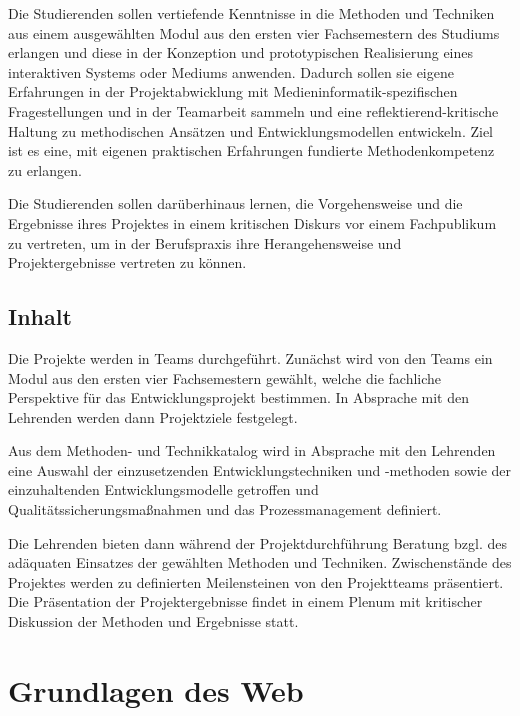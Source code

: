 Die Studierenden sollen vertiefende Kenntnisse in die Methoden und
Techniken aus einem ausgewählten Modul aus den ersten vier Fachsemestern
des Studiums erlangen und diese in der Konzeption und prototypischen
Realisierung eines interaktiven Systems oder Mediums anwenden. Dadurch
sollen sie eigene Erfahrungen in der Projektabwicklung mit
Medieninformatik-spezifischen Fragestellungen und in der Teamarbeit
sammeln und eine reflektierend-kritische Haltung zu methodischen
Ansätzen und Entwicklungsmodellen entwickeln. Ziel ist es eine, mit
eigenen praktischen Erfahrungen fundierte Methodenkompetenz zu erlangen.

Die Studierenden sollen darüberhinaus lernen, die Vorgehensweise und die
Ergebnisse ihres Projektes in einem kritischen Diskurs vor einem
Fachpublikum zu vertreten, um in der Berufspraxis ihre Herangehensweise
und Projektergebnisse vertreten zu können.

\hypertarget{inhaltpathlabelmi-2017modulbeschreibungen-bachelorba_entwicklungsprojekt}{%
\section*{Inhalt\label{/mi-2017/modulbeschreibungen-bachelor/BA_Entwicklungsprojekt}}\label{inhaltpathlabelmi-2017modulbeschreibungen-bachelorba_entwicklungsprojekt}}

Die Projekte werden in Teams durchgeführt. Zunächst wird von den Teams
ein Modul aus den ersten vier Fachsemestern gewählt, welche die
fachliche Perspektive für das Entwicklungsprojekt bestimmen. In
Absprache mit den Lehrenden werden dann Projektziele festgelegt.

Aus dem Methoden- und Technikkatalog wird in Absprache mit den Lehrenden
eine Auswahl der einzusetzenden Entwicklungstechniken und -methoden
sowie der einzuhaltenden Entwicklungsmodelle getroffen und
Qualitätssicherungsmaßnahmen und das Prozessmanagement definiert.

Die Lehrenden bieten dann während der Projektdurchführung Beratung bzgl.
des adäquaten Einsatzes der gewählten Methoden und Techniken.
Zwischenstände des Projektes werden zu definierten Meilensteinen von den
Projektteams präsentiert. Die Präsentation der Projektergebnisse findet
in einem Plenum mit kritischer Diskussion der Methoden und Ergebnisse
statt.

\hypertarget{grundlagen-des-webpathlabelmi-2017modulbeschreibungen-bachelorba_grundlagen-des-web}{%
\chapter{Grundlagen des
Web\label{/mi-2017/modulbeschreibungen-bachelor/BA_Grundlagen-des-web}}\label{grundlagen-des-webpathlabelmi-2017modulbeschreibungen-bachelorba_grundlagen-des-web}}

